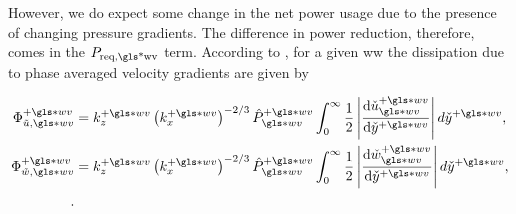 However, we do expect some change in the net power usage due to the presence of changing pressure gradients. The difference in power reduction, therefore, comes in the $P_\text{req,\gls*{wv}} $ term. According to \sct, for a given \gls*{ww} the dissipation due to phase averaged velocity gradients are given by %

\begin{align}
	\Phi _{\tilde{u},\gls*{wv}}\pw&=k_z\pw \left(k_x\pw\right)^{-2 /3} \hat{P}\ww\pw \int_{0}^{\infty} \frac{1}{2} \left| \dv{\check{u}\ww\pw}{\check{y}\pw}  \right| d\check{y}\pw,\\
	\Phi _{\tilde{w},\gls*{wv}}\pw&=k_z\pw \left(k_x\pw\right)^{-2 /3} \hat{P}\ww\pw \int_{0}^{\infty} \frac{1}{2} \left| \dv{\check{w}\ww\pw}{\check{y}\pw}  \right| d\check{y}\pw,\\
.\end{align}

